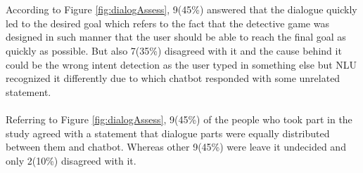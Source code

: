 \\~\\
According to Figure \ref{fig:dialogAssess}, 9(45\%) answered that the dialogue quickly led to the desired goal which refers to the fact that the detective game was designed in such manner that the user should be able to reach the final goal as quickly as possible. But also 7(35\%) disagreed with it and the cause behind it could be the wrong intent detection as the user typed in something else but NLU recognized it differently due to which chatbot responded with some unrelated statement.
\\~\\
Referring to Figure \ref{fig:dialogAssess}, 9(45\%) of the people who took part in the study agreed with a statement that dialogue parts were equally distributed between them and chatbot. Whereas other 9(45\%) were leave it undecided and only 2(10\%) disagreed with it.


